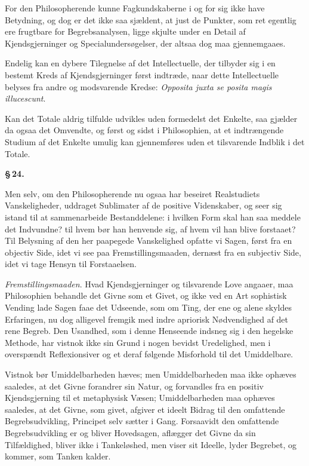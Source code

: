 \documentclass[12pt]{book}
\newcommand{\opage}[1]{\marginnote{\footnotesize\textit{[#1]}}}
\begin{document}
For den Philosopherende kunne Fagkundskaberne i og for sig ikke have Betydning, og dog er
det ikke saa sjældent, at just de Punkter, som ret egentlig ere frugtbare for
Begrebsanalysen, ligge skjulte under en Detail af Kjendsgjerninger og Specialundersøgelser,
der altsaa dog maa gjennemgaaes.

Endelig kan en dybere Tilegnelse af det Intellectuelle, der tilbyder sig i en bestemt Kreds
af Kjendsgjerninger først indtræde, naar dette Intellectuelle belyses fra andre og
modsvarende Kredse: \textit{Opposita juxta se posita magis illucescunt}.

Kan det Totale aldrig tilfulde udvikles uden formedelst det Enkelte, saa gjælder da ogsaa
det Omvendte, og først og sidst i Philosophien, at et indtrængende Studium af det Enkelte
umulig kan gjennemføres uden et tilsvarende Indblik i det Totale.

\begin{center}{\bfseries \S\,24.}\end{center}

Men selv, om den Philosopherende nu ogsaa har beseiret Realstudiets Vanskeligheder, uddraget
Sublimater af de positive Videnskaber, og seer sig istand til at sammenarbeide
Bestanddelene: i hvilken Form skal han saa meddele det Indvundne? til hvem bør han henvende
sig, af hvem vil han blive forstaaet? Til Belysning af den her paapegede Vanskelighed
opfatte vi Sagen, først fra en objectiv Side, idet vi see paa Fremstillingsmaaden, dernæst
fra en subjectiv Side, idet vi tage Hensyn til Forstaaelsen.

\emph{Fremstillingsmaaden}. Hvad Kjendsgjerninger og tilsvarende Love angaaer, maa
Philosophien behandle det Givne som et Givet, og ikke ved en Art sophistisk Vending lade
Sagen faae det Udseende, som om Ting, der ene og alene skyldes Erfaringen, nu dog alligevel
fremgik med indre apriorisk Nødvendighed af det rene Begreb. Den Usandhed,
\opage{108} som i denne Henseende indsneg sig i den hegelske Methode, har vistnok ikke sin Grund i nogen
bevidst Uredelighed, men i overspændt Reflexionsiver og et deraf følgende Misforhold til det
Umiddelbare.

Vistnok bør Umiddelbarheden hæves; men Umiddelbarheden maa ikke ophæves saaledes, at det
Givne forandrer sin Natur, og forvandles fra en positiv Kjendsgjerning til et metaphysisk
Væsen; Umiddelbarheden maa ophæves saaledes, at det Givne, som givet, afgiver et ideelt
Bidrag til den omfattende Begrebsudvikling, Principet selv sætter i Gang. Forsaavidt den
omfattende Begrebsudvikling er og bliver Hovedsagen, aflægger det Givne da sin Tilfældighed,
bliver ikke i Tankeløshed, men viser sit Ideelle, lyder Begrebet, og kommer, som Tanken
kalder.
\end{document}
